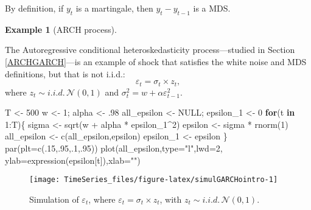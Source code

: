 \documentclass[
  12pt,
]{book}
\newenvironment{Shaded}{\begin{snugshade}}{\end{snugshade}}
\newcommand{\AttributeTok}[1]{\textcolor[rgb]{0.77,0.63,0.00}{#1}}
\newcommand{\ConstantTok}[1]{\textcolor[rgb]{0.00,0.00,0.00}{#1}}
\newcommand{\ControlFlowTok}[1]{\textcolor[rgb]{0.13,0.29,0.53}{\textbf{#1}}}
\newcommand{\DecValTok}[1]{\textcolor[rgb]{0.00,0.00,0.81}{#1}}
\newcommand{\FunctionTok}[1]{\textcolor[rgb]{0.00,0.00,0.00}{#1}}
\newcommand{\NormalTok}[1]{#1}
\newcommand{\OtherTok}[1]{\textcolor[rgb]{0.56,0.35,0.01}{#1}}
\newcommand{\SpecialCharTok}[1]{\textcolor[rgb]{0.00,0.00,0.00}{#1}}
\newcommand{\StringTok}[1]{\textcolor[rgb]{0.31,0.60,0.02}{#1}}
\theoremstyle{definition}
\theoremstyle{definition}
\newtheorem{example}{Example}[chapter]
\theoremstyle{definition}
\theoremstyle{definition}
\theoremstyle{remark}
\begin{document}
By definition, if \(y_t\) is a martingale, then \(y_{t}-y_{t-1}\) is a MDS.

\begin{example}[ARCH process]
\protect\hypertarget{exm:ARCH}{}\label{exm:ARCH}

The Autoregressive conditional heteroskedasticity process---studied in Section \ref{ARCHGARCH}---is an example of shock that satisfies the white noise and MDS definitions, but that is not i.i.d.:
\[
\varepsilon_{t} = \sigma_t \times z_{t},
\]
where \(z_t \sim i.i.d.\,\mathcal{N}(0,1)\) and \(\sigma_t^2 = w + \alpha \varepsilon_{t-1}^2\).

\begin{Shaded}
\begin{Highlighting}[]
\NormalTok{T }\OtherTok{\textless{}{-}} \DecValTok{500}
\NormalTok{w }\OtherTok{\textless{}{-}} \DecValTok{1}\NormalTok{; alpha }\OtherTok{\textless{}{-}}\NormalTok{ .}\DecValTok{98}
\NormalTok{all\_epsilon }\OtherTok{\textless{}{-}} \ConstantTok{NULL}\NormalTok{; epsilon\_1 }\OtherTok{\textless{}{-}} \DecValTok{0}
\ControlFlowTok{for}\NormalTok{(t }\ControlFlowTok{in} \DecValTok{1}\SpecialCharTok{:}\NormalTok{T)\{}
\NormalTok{  sigma }\OtherTok{\textless{}{-}} \FunctionTok{sqrt}\NormalTok{(w }\SpecialCharTok{+}\NormalTok{ alpha }\SpecialCharTok{*}\NormalTok{ epsilon\_1}\SpecialCharTok{\^{}}\DecValTok{2}\NormalTok{)}
\NormalTok{  epsilon }\OtherTok{\textless{}{-}}\NormalTok{ sigma }\SpecialCharTok{*} \FunctionTok{rnorm}\NormalTok{(}\DecValTok{1}\NormalTok{)}
\NormalTok{  all\_epsilon }\OtherTok{\textless{}{-}} \FunctionTok{c}\NormalTok{(all\_epsilon,epsilon)}
\NormalTok{  epsilon\_1 }\OtherTok{\textless{}{-}}\NormalTok{ epsilon}
\NormalTok{\}}
\FunctionTok{par}\NormalTok{(}\AttributeTok{plt=}\FunctionTok{c}\NormalTok{(.}\DecValTok{15}\NormalTok{,.}\DecValTok{95}\NormalTok{,.}\DecValTok{1}\NormalTok{,.}\DecValTok{95}\NormalTok{))}
\FunctionTok{plot}\NormalTok{(all\_epsilon,}\AttributeTok{type=}\StringTok{"l"}\NormalTok{,}\AttributeTok{lwd=}\DecValTok{2}\NormalTok{,}
     \AttributeTok{ylab=}\FunctionTok{expression}\NormalTok{(epsilon[t]),}\AttributeTok{xlab=}\StringTok{""}\NormalTok{)}
\end{Highlighting}
\end{Shaded}

\begin{figure}
\texttt{[image: TimeSeries\_files/figure-latex/simulGARCHointro-1]} \caption{Simulation of $\varepsilon_t$, where $\varepsilon_{t} = \sigma_t \times z_{t}$, with $z_t \sim i.i.d.\,\mathcal{N}(0,1)$.}\label{fig:simulGARCHointro}
\end{figure}

\end{example}
\end{document}
